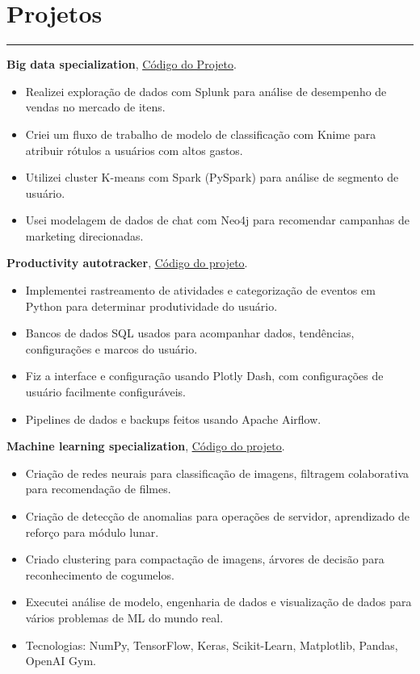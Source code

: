 \documentclass[a4paper,10pt]{article}
\newcommand{\ulink}[2]{\href{#1}{\underline{#2}}}
\begin{document}
\section*{Projetos}
\hrule
\vspace{2mm}
\textbf{Big data specialization}, \ulink{https://github.com/rokobo/Big-Data-Specialization}{Código do Projeto}.
\begin{itemize}[itemsep=0pt]
  \item Realizei exploração de dados com Splunk para análise de desempenho de vendas no mercado de itens.
  \item Criei um fluxo de trabalho de modelo de classificação com Knime para atribuir rótulos a usuários com altos gastos.
  \item Utilizei cluster K-means com Spark (PySpark) para análise de segmento de usuário.
  \item Usei modelagem de dados de chat com Neo4j para recomendar campanhas de marketing direcionadas.
\end{itemize}
\textbf{Productivity autotracker}, \ulink{https://github.com/rokobo/Productivity-autotracker}{Código do projeto}.
\begin{itemize}[itemsep=0pt]
  \item Implementei rastreamento de atividades e categorização de eventos em Python para determinar produtividade do usuário.
  \item Bancos de dados SQL usados para acompanhar dados, tendências, configurações e marcos do usuário.
  \item Fiz a interface e configuração usando Plotly Dash, com configurações de usuário facilmente configuráveis.
  \item Pipelines de dados e backups feitos usando Apache Airflow.
\end{itemize}
\textbf{Machine learning specialization}, \ulink{https://github.com/rokobo/Machine-learning-specialization}{Código do projeto}.
\begin{itemize}[itemsep=0pt]
  \item Criação de redes neurais para classificação de imagens, filtragem colaborativa para recomendação de filmes.
  \item Criação de detecção de anomalias para operações de servidor, aprendizado de reforço para módulo lunar.
  \item Criado clustering para compactação de imagens, árvores de decisão para reconhecimento de cogumelos.
  \item Executei análise de modelo, engenharia de dados e visualização de dados para vários problemas de ML do mundo real.
  \item Tecnologias: NumPy, TensorFlow, Keras, Scikit-Learn, Matplotlib, Pandas, OpenAI Gym.
\end{itemize}
\end{document}
